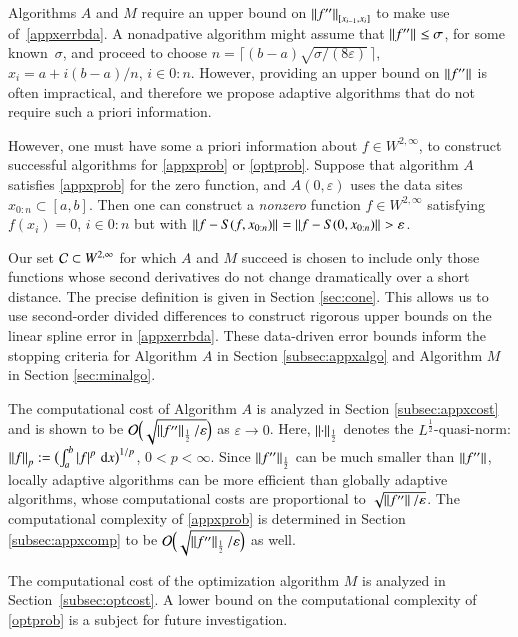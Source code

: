 \documentclass[review]{elsarticle}
\newcommand{\abstol}{\varepsilon}
\newcommand{\zton}{0\!:\!n}
\newcommand{\datasites}{x_{0:n}}
\theoremstyle{definition}
\renewcommand{\cw}{W}
\begin{document}
Algorithms $A$ and $M$ require an upper bound on $\norm[{[x_{i-1},x_i]}]{f''}$
to make use of~\eqref{appxerrbda}. A nonadpative algorithm might assume that
$\norm{f''} \le \sigma$, for some known~$\sigma$, and proceed to choose $n =
\bigl \lceil (b-a)\sqrt{\sigma/(8 \varepsilon)} \, \bigr \rceil$, $x_i = a +
i(b-a)/n$, $i \in 0\!:\!n$. However, providing an upper bound on $\norm{f''}$ is
often impractical, and therefore we propose adaptive algorithms that do not
require such a priori information.

However, one must have some a priori information about $f \in \cw^{2,\infty} $,
to construct successful algorithms for \eqref{appxprob} or \eqref{optprob}.
Suppose that algorithm $A$ satisfies \eqref{appxprob} for the zero function, and
$A(0,\varepsilon)$ uses the data sites $x_{0:n}\subset [a,b]$. Then one can
construct a \emph{nonzero} function $f \in \cw^{2,\infty}$ satisfying $f(x_i) =
0$, $i\in \zton$ but with $\norm{f - S(f,\datasites)} = \norm{f -
S(0,\datasites)} > \varepsilon$.

Our set $\cc \subset \cw^{2,\infty}$ for which $A$ and $M$ succeed is chosen to
include only those functions whose second derivatives do not change dramatically
over a short distance. The precise definition is given in Section
\ref{sec:cone}. This allows us to use second-order divided differences to
construct rigorous upper bounds on the linear spline error in
\eqref{appxerrbda}. These data-driven error bounds inform the stopping criteria
for Algorithm $A$ in Section \ref{subsec:appxalgo} and Algorithm $M$ in Section
\ref{sec:minalgo}.

The computational cost of Algorithm $A$ is analyzed in Section
\ref{subsec:appxcost} and is shown to be
$\Order\Bigl(\sqrt{\norm[\frac12]{f''}/\abstol}\Bigr)$ as $\abstol \to 0$. Here,
$\norm[\frac12]{\cdot}$ denotes the $L^{\frac12}$-quasi-norm: $\norm[p]{f} :=
\bigl(\int_a^b \abs{f}^p \, \dif x \bigr)^{1/p}$, $0 < p < \infty$. Since
$\norm[\frac12]{f''}$ can be much smaller than $\norm{f''}$, locally adaptive
algorithms can be more efficient than globally adaptive algorithms, whose
computational costs are proportional to $\sqrt{\norm{f''}/\abstol}$. The
computational complexity of \eqref{appxprob} is determined in Section
\ref{subsec:appxcomp} to be
$\Order\Bigl(\sqrt{\norm[\frac12]{f''}/\abstol}\Bigr)$ as well.

The computational cost of the optimization algorithm $M$ is analyzed in
Section~\ref{subsec:optcost}. A lower bound on the computational complexity of
\eqref{optprob} is a subject for future investigation.
\end{document}
